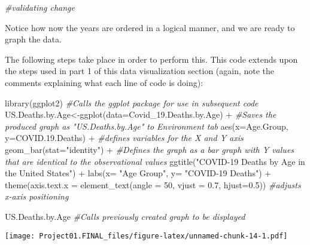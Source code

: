 \documentclass[
]{article}
\newenvironment{Shaded}{\begin{snugshade}}{\end{snugshade}}
\newcommand{\AttributeTok}[1]{\textcolor[rgb]{0.77,0.63,0.00}{#1}}
\newcommand{\CommentTok}[1]{\textcolor[rgb]{0.56,0.35,0.01}{\textit{#1}}}
\newcommand{\DecValTok}[1]{\textcolor[rgb]{0.00,0.00,0.81}{#1}}
\newcommand{\FloatTok}[1]{\textcolor[rgb]{0.00,0.00,0.81}{#1}}
\newcommand{\FunctionTok}[1]{\textcolor[rgb]{0.00,0.00,0.00}{#1}}
\newcommand{\NormalTok}[1]{#1}
\newcommand{\OtherTok}[1]{\textcolor[rgb]{0.56,0.35,0.01}{#1}}
\newcommand{\SpecialCharTok}[1]{\textcolor[rgb]{0.00,0.00,0.00}{#1}}
\newcommand{\StringTok}[1]{\textcolor[rgb]{0.31,0.60,0.02}{#1}}
\begin{document}
\begin{Shaded}
\begin{Highlighting}[]
\CommentTok{\#validating change}
\end{Highlighting}
\end{Shaded}

Notice how now the years are ordered in a logical manner, and we are
ready to graph the data.

The following steps take place in order to perform this. This code
extends upon the steps used in part 1 of this data visualization section
(again, note the comments explaining what each line of code is doing):

\begin{Shaded}
\begin{Highlighting}[]
\FunctionTok{library}\NormalTok{(ggplot2) }\CommentTok{\#Calls the ggplot package for use in subsequent code}
\NormalTok{US.Deaths.by.Age}\OtherTok{\textless{}{-}}\FunctionTok{ggplot}\NormalTok{(}\AttributeTok{data=}\NormalTok{Covid\_19.Deaths.by.Age) }\SpecialCharTok{+} \CommentTok{\#Saves the produced graph as "US.Deaths.by.Age" to Environment tab}
  \FunctionTok{aes}\NormalTok{(}\AttributeTok{x=}\NormalTok{Age.Group, }\AttributeTok{y=}\NormalTok{COVID.}\FloatTok{19.}\NormalTok{Deaths) }\SpecialCharTok{+} \CommentTok{\#defines variables for the X and Y axis}
  \FunctionTok{geom\_bar}\NormalTok{(}\AttributeTok{stat=}\StringTok{"identity"}\NormalTok{) }\SpecialCharTok{+} \CommentTok{\#Defines the graph as a bar graph with Y values that are identical to the observational values}
  \FunctionTok{ggtitle}\NormalTok{(}\StringTok{"COVID{-}19 Deaths by Age in the United States"}\NormalTok{) }\SpecialCharTok{+}
  \FunctionTok{labs}\NormalTok{(}\AttributeTok{x=} \StringTok{"Age Group"}\NormalTok{, }\AttributeTok{y=} \StringTok{"COVID{-}19 Deaths"}\NormalTok{) }\SpecialCharTok{+}
  \FunctionTok{theme}\NormalTok{(}\AttributeTok{axis.text.x =} \FunctionTok{element\_text}\NormalTok{(}\AttributeTok{angle =} \DecValTok{50}\NormalTok{, }\AttributeTok{vjust =} \FloatTok{0.7}\NormalTok{, }\AttributeTok{hjust=}\FloatTok{0.5}\NormalTok{)) }\CommentTok{\#adjusts x{-}axis positioning}
  

\NormalTok{US.Deaths.by.Age }\CommentTok{\#Calls previously created graph to be displayed}
\end{Highlighting}
\end{Shaded}

\texttt{[image: Project01.FINAL\_files/figure-latex/unnamed-chunk-14-1.pdf]}
\end{document}
